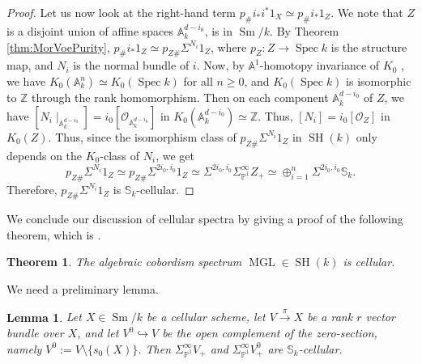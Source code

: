 \documentclass[10pt]{amsart}
\theoremstyle{definition}
\theoremstyle{plain}
\newtheorem{thm}[defn]{Theorem}
\newtheorem{lemma}[defn]{Lemma}
\numberwithin{equation}{section}
\newcommand{\0}{\emptyset}
\newcommand{\sO}{{\mathcal O}}
\newcommand{\A}{{\mathbb A}}
\renewcommand{\P}{{\mathbb P}}
\newcommand{\Z}{{\mathbb Z}}
\newcommand{\MGL}{{\operatorname{MGL}}}
\newcommand{\Spec}{{\operatorname{Spec}}}
\newcommand{\SH}{{\operatorname{SH}}}
\newcommand{\Sm}{{\operatorname{Sm}}}
\begin{document}
\begin{proof}
    Let us now look at the right-hand term $p_\#i_*i^*1_X \simeq p_\#i_*1_Z$. We note that $Z$ is a disjoint union of affine spaces $\A^{d-i_0}_k$, is in $\Sm/k$. By Theorem \ref{thm:MorVoePurity}, $p_\#i_*1_Z \simeq p_{Z\#}\Sigma^{N_i}1_Z$, where $p_Z:Z \to \Spec k$ is the structure map, and $N_i$ is the normal bundle of $i$. Now, by $\A^1$-homotopy invariance of $K_0$ \cite[Corollary to Theorem 8, p. 122]{Quillen:K}, we have $K_0(\A_k^n)\simeq K_0(\Spec k)$ for all $n\ge 0$, and $K_0(\Spec k)$ is isomorphic to $\Z$ through the rank homomorphism. Then on each component $\A_k^{d-i_0}$ of $Z$, we have $[N_i\mid_{\A_k^{d-i_0}}]=i_0[\sO_{\A_k^{d-i_0}}]$ in $K_0(\A_k^{d-i_0})\simeq \Z$. Thus, $[N_i]=i_0[\sO_Z]$ in $K_0(Z)$. Thus, since the isomorphism class of 
    $p_{Z\#}\Sigma^{N_i}1_Z$ in $\SH(k)$ only depends on the $K_0$-class of $N_i$, we get
    $$p_{Z\#}\Sigma^{N_i}1_Z \simeq p_{Z\#}\Sigma^{2i_0, i_0}1_Z \simeq \Sigma^{2i_0, i_0}\Sigma^\infty_{\P^1}Z_+\simeq  \oplus_{i=1}^n\Sigma^{2i_0,i_0} \mathbb{S}_k.$$
    Therefore, $p_{Z\#}\Sigma^{N_i}1_Z$ is $\mathbb{S}_k$-cellular. 
\end{proof}

We conclude our discussion of cellular spectra by giving a proof of the following theorem, which is \cite[Theorem 6.4]{dugisa:cellstructures}.

\begin{thm}
\label{thm:mglcellular}
    The algebraic cobordism spectrum $\MGL \in \SH(k)$ is cellular.
\end{thm}
We need a preliminary lemma.

\begin{lemma}\label{lemma:cellularSchemes2} Let $X\in \Sm/k$ be a cellular scheme, let $V\xrightarrow{\pi} X$ be a rank $r$ vector bundle over $X$, and let $V^0\hookrightarrow V$ be the open complement of the zero-section, namely $V^0:=V\setminus\{s_0(X)\}$. Then $\Sigma^\infty_{\P^1}V_+$ and $\Sigma^\infty_{\P^1}V^0_+$ are $\mathbb{S}_k$-cellular.
\end{lemma}
\end{document}
